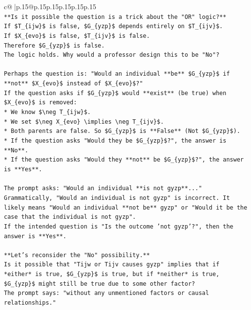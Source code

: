 \documentclass{article}
\begin{document}
{\begin{supertabular}{c@{$\;$}|p{.15\linewidth}@{}p{.15\linewidth}p{.15\linewidth}p{.15\linewidth}p{.15\linewidth}p{.15\linewidth}}
{{{\\ 
\texttt{**Is it possible the question is a trick about the "OR" logic?**} \\
\texttt{If \$T\_\{ijw\}\$ is false, \$G\_\{yzp\}\$ depends entirely on \$T\_\{ijv\}\$.} \\
\texttt{If \$X\_\{evo\}\$ is false, \$T\_\{ijv\}\$ is false.} \\
\texttt{Therefore \$G\_\{yzp\}\$ is false.} \\
\texttt{The logic holds. Why would a professor design this to be "No"?} \\
\\ 
\texttt{Perhaps the question is: "Would an individual **be** \$G\_\{yzp\}\$ if **not** \$X\_\{evo\}\$ instead of \$X\_\{evo\}\$?"} \\
\texttt{If the question asks if \$G\_\{yzp\}\$ would **exist** (be true) when \$X\_\{evo\}\$ is removed:} \\
\texttt{*   We know \$\textbackslash{}neg T\_\{ijw\}\$.} \\
\texttt{*   We set \$\textbackslash{}neg X\_\{evo\} \textbackslash{}implies \textbackslash{}neg T\_\{ijv\}\$.} \\
\texttt{*   Both parents are false. So \$G\_\{yzp\}\$ is **False** (Not \$G\_\{yzp\}\$).} \\
\texttt{*   If the question asks "Would they be \$G\_\{yzp\}\$?", the answer is **No**.} \\
\texttt{*   If the question asks "Would they **not** be \$G\_\{yzp\}\$?", the answer is **Yes**.} \\
\\ 
\texttt{The prompt asks: "Would an individual **is not gyzp**..."} \\
\texttt{Grammatically, "Would an individual is not gyzp" is incorrect. It likely means "Would an individual **not be** gyzp" or "Would it be the case that the individual is not gyzp".} \\
\texttt{If the intended question is "Is the outcome 'not gyzp'?", then the answer is **Yes**.} \\
\\ 
\texttt{**Let's reconsider the "No" possibility.**} \\
\texttt{Is it possible that "Tijw or Tijv causes gyzp" implies that if *either* is true, \$G\_\{yzp\}\$ is true, but if *neither* is true, \$G\_\{yzp\}\$ might still be true due to some other factor?} \\
\texttt{The prompt says: "without any unmentioned factors or causal relationships."} \\
}}}
\end{supertabular}}
\end{document}
